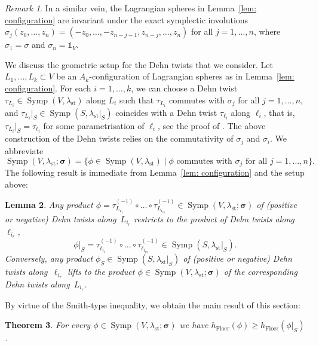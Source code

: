 \documentclass[12pt]{article}
\renewcommand{\ge}{\geqslant}
\theoremstyle{theorem}
\newtheorem{theorem}{Theorem}[section]
\newtheorem{lemma}[theorem]{Lemma}
\theoremstyle{definition}
\theoremstyle{remark}
\newtheorem{remark}[theorem]{Remark}
\numberwithin{equation}{section}
\DeclareMathOperator{\floer}{Floer}
\DeclareMathOperator{\Symp}{Symp}
\DeclareMathOperator{\st}{st}
\begin{document}
\begin{remark}\label{rem: inv_ak_spheres}
In a similar vein, the Lagrangian spheres in Lemma~\ref{lem: configuration} are invariant under the exact symplectic involutions $\sigma_j(z_0,\dots,z_n)=(-z_0,\dots,-z_{n-j-1},z_{n-j},\dots ,z_n)$ for all $j=1,\dots,n$, where $\sigma_1=\sigma$ and $\sigma_n=\mathds{1}_V$.
\end{remark}
We discuss the geometric setup for the Dehn twists that we consider.
Let $L_1,\dots,L_k\subset V$ be an $A_k$-configuration of Lagrangian spheres as in Lemma~\ref{lem: configuration}.
For each $i=1,\dots,k$, we can choose a Dehn twist $\tau_{L_i}\in \Symp(V,\lambda_{\st})$ along $L_i$ such that $\tau_{L_i}$ commutes with $\sigma_j$ for all $j=1,\dots,n$, and $\tau_{L_i}|_S\in \Symp(S,\lambda_{\st}|_S)$ coincides with a Dehn twist $\tau_{\ell_i}$ along $\ell_i$, that is, $\tau_{L_i}|_S=\tau_{\ell_i}$ for some parametrisation of $\ell_i$, see the proof of \cite[Lemma~4.9]{To15}.
The above construction of the Dehn twists relies on the commutativity of $\sigma_j$ and $\sigma_i$.
We abbreviate
$$
\Symp(V,\lambda_{\st};{\bm \sigma})=\{\phi\in \Symp(V,\lambda_{\st}) \mid \text{$\phi$ commutes with $\sigma_j$ for all $j=1,\dots,n$} \}.
$$
The following result is immediate from Lemma~\ref{lem: configuration} and the setup above:
\begin{lemma}\label{lem: lift_dehntwists}
Any product $\phi=\tau_{L_{i_1}}^{(-1)}\circ \dots \circ \tau_{L_{i_m}}^{(-1)}\in \Symp(V,\lambda_{\st};{\bm \sigma})$ of (positive or negative) Dehn twists along~$L_{i_r}$ restricts to the product of Dehn twists along $\ell_{i_r}$,
$$
\phi|_S=\tau_{\ell_{i_1}}^{(-1)}\circ \dots \circ \tau_{\ell_{i_m}}^{(-1)}\in \Symp(S,\lambda_{\st}|_S).
$$
Conversely, any product $\phi_S\in \Symp(S,\lambda_{\st}|_S)$ of (positive or negative) Dehn twists along~$\ell_{i_r}$ lifts to the product $\phi\in \Symp(V,\lambda_{\st};{\bm \sigma})$ of the corresponding Dehn twists along~$L_{i_r}$.
\end{lemma}
By virtue of the Smith-type inequality, we obtain the main result of this section:
\begin{theorem}\label{thm: milnor_smith}
For every $\phi\in \Symp(V,\lambda_{\st};{\bm \sigma})$ we have $h_{\floer}(\phi)\ge h_{\floer}(\phi|_S)$.
\end{theorem}
\end{document}
